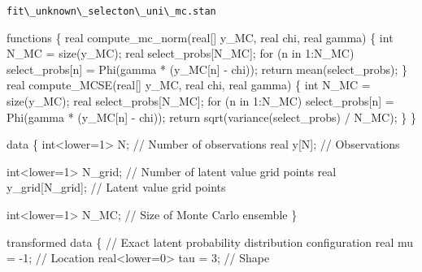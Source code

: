 \documentclass[
  letterpaper,
  DIV=11,
  numbers=noendperiod]{scrartcl}
\newenvironment{Shaded}{\begin{snugshade}}{\end{snugshade}}
\newcommand{\CommentTok}[1]{\textcolor[rgb]{0.37,0.37,0.37}{#1}}
\newcommand{\ControlFlowTok}[1]{\textcolor[rgb]{0.00,0.23,0.31}{#1}}
\newcommand{\DataTypeTok}[1]{\textcolor[rgb]{0.68,0.00,0.00}{#1}}
\newcommand{\DecValTok}[1]{\textcolor[rgb]{0.68,0.00,0.00}{#1}}
\newcommand{\KeywordTok}[1]{\textcolor[rgb]{0.00,0.23,0.31}{#1}}
\newcommand{\NormalTok}[1]{\textcolor[rgb]{0.00,0.23,0.31}{#1}}
\begin{document}
\begin{codelisting}

\caption{\texttt{fit\textbackslash\_unknown\textbackslash\_selecton\textbackslash\_uni\textbackslash\_mc.stan}}

\begin{Shaded}
\begin{Highlighting}[]
\KeywordTok{functions}\NormalTok{ \{}
  \DataTypeTok{real}\NormalTok{ compute\_mc\_norm(}\DataTypeTok{real}\NormalTok{[] y\_MC, }\DataTypeTok{real}\NormalTok{ chi, }\DataTypeTok{real}\NormalTok{ gamma) \{}
    \DataTypeTok{int}\NormalTok{ N\_MC = size(y\_MC);}
    \DataTypeTok{real}\NormalTok{ select\_probs[N\_MC];}
    \ControlFlowTok{for}\NormalTok{ (n }\ControlFlowTok{in} \DecValTok{1}\NormalTok{:N\_MC) }
\NormalTok{      select\_probs[n] = Phi(gamma * (y\_MC[n] {-} chi));}
    \ControlFlowTok{return}\NormalTok{ mean(select\_probs);}
\NormalTok{  \}}
  \DataTypeTok{real}\NormalTok{ compute\_MCSE(}\DataTypeTok{real}\NormalTok{[] y\_MC, }\DataTypeTok{real}\NormalTok{ chi, }\DataTypeTok{real}\NormalTok{ gamma) \{}
    \DataTypeTok{int}\NormalTok{ N\_MC = size(y\_MC);}
    \DataTypeTok{real}\NormalTok{ select\_probs[N\_MC];}
    \ControlFlowTok{for}\NormalTok{ (n }\ControlFlowTok{in} \DecValTok{1}\NormalTok{:N\_MC) }
\NormalTok{      select\_probs[n] = Phi(gamma * (y\_MC[n] {-} chi));}
    \ControlFlowTok{return}\NormalTok{ sqrt(variance(select\_probs) / N\_MC);}
\NormalTok{  \}}
\NormalTok{\}}

\KeywordTok{data}\NormalTok{ \{}
  \DataTypeTok{int}\NormalTok{\textless{}}\KeywordTok{lower}\NormalTok{=}\DecValTok{1}\NormalTok{\textgreater{} N; }\CommentTok{// Number of observations}
  \DataTypeTok{real}\NormalTok{ y[N];      }\CommentTok{// Observations}

  \DataTypeTok{int}\NormalTok{\textless{}}\KeywordTok{lower}\NormalTok{=}\DecValTok{1}\NormalTok{\textgreater{} N\_grid; }\CommentTok{// Number of latent value grid points}
  \DataTypeTok{real}\NormalTok{ y\_grid[N\_grid]; }\CommentTok{// Latent value grid points}

  \DataTypeTok{int}\NormalTok{\textless{}}\KeywordTok{lower}\NormalTok{=}\DecValTok{1}\NormalTok{\textgreater{} N\_MC; }\CommentTok{// Size of Monte Carlo ensemble}
\NormalTok{\}}

\KeywordTok{transformed data}\NormalTok{ \{}
  \CommentTok{// Exact latent probability distribution configuration}
  \DataTypeTok{real}\NormalTok{ mu = {-}}\DecValTok{1}\NormalTok{;          }\CommentTok{// Location}
  \DataTypeTok{real}\NormalTok{\textless{}}\KeywordTok{lower}\NormalTok{=}\DecValTok{0}\NormalTok{\textgreater{} tau = }\DecValTok{3}\NormalTok{; }\CommentTok{// Shape}
  

\end{Highlighting}
\end{Shaded}
\end{codelisting}
\end{document}
